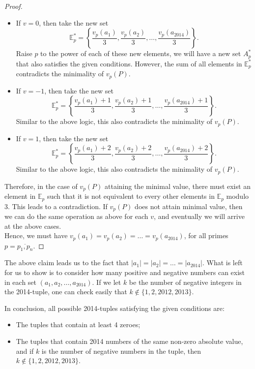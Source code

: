 \documentclass[11pt]{article}
\begin{document}
\begin{solution}
\begin{proof}
                \begin{itemize}
                    \item If \(v = 0\), then take the new set
                    \[\mathbb{E}_p^* = \left\{\frac{v_p(a_1)}{3}, \frac{v_p(a_2)}{3}, \dots, \frac{v_p(a_{2014})}{3}\right\}.\]
                    Raise \(p\) to the power of each of these new elements, we will have a new set \(A_p^*\) that also satisfies the given conditions. However, the sum of all elements in \(\mathbb{E}_p^*\) contradicts the minimality of \(v_p(P)\).
                    \item If \(v = -1\), then take the new set
                    \[\mathbb{E}_p^* = \left\{\frac{v_p(a_1) + 1}{3}, \frac{v_p(a_2) + 1}{3}, \dots, \frac{v_p(a_{2014}) + 1}{3}\right\}.\]
                    Similar to the above logic, this also contradicts the minimality of \(v_p(P)\).
                    \item If \(v = 1\), then take the new set
                    \[\mathbb{E}_p^* = \left\{\frac{v_p(a_1) + 2}{3}, \frac{v_p(a_2) + 2}{3}, \dots, \frac{v_p(a_{2014}) + 2}{3}\right\}.\]
                    Similar to the above logic, this also contradicts the minimality of \(v_p(P)\).
                \end{itemize}

                Therefore, in the case of \(v_p(P)\) attaining the minimal value, there must exist an element in \(\mathbb{E}_p\) such that it is not equivalent to every other elements in \(\mathbb{E}_p\) modulo 3. This leads to a contradiction. If \(v_p(P)\) does not attain minimal value, then we can do the same operation as above for each \(v\), and eventually we will arrive at the above cases.\\
                Hence, we must have \(v_p(a_1) = v_p(a_2) = \dots = v_p(a_{2014})\), for all primes \(p = \overline{p_1,p_n}\).
            \end{proof}

            The above claim leads us to the fact that \(|a_1| = |a_2| = \dots = |a_{2014}|\). What is left for us to show is to consider how many positive and negative numbers can exist in each set \((a_1, a_2, \dots, a_{2014})\). If we let \(k\) be the number of negative integers in the 2014-tuple, one can check easily that \(k \not\in \{1,2,2012,2013\}\).

            In conclusion, all possible 2014-tuples satisfying the given conditions are:
            
            \begin{itemize}
                \item The tuples that contain at least 4 zeroes;
                \item The tuples that contain 2014 numbers of the same non-zero absolute value, and if \(k\) is the number of negative numbers in the tuple, then \(k \not\in \{1,2,2012,2013\}\).
            \end{itemize}
        \end{solution}
\end{document}
